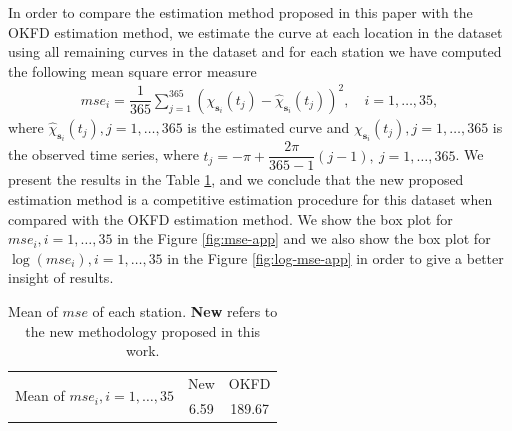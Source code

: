 \documentclass[
  12pt,
]{article}
\theoremstyle{definition}
\theoremstyle{definition}
\theoremstyle{definition}
\theoremstyle{remark}
\begin{document}
In order to compare the estimation method proposed in this paper with the OKFD estimation method, we estimate the curve at each location in the dataset using all remaining curves in the dataset and for each station we have computed the following mean square error measure
\begin{align*}
 mse_i = \dfrac{1}{365} \sum_{j=1}^{365} (\chi_{\bm{s}_i}(t_j) - \hat\chi_{\bm{s}_i}(t_j))^2, \quad i =1, \dots, 35,
\end{align*}
where \(\hat\chi_{\bm{s}_i}(t_j), j=1, \dots, 365\) is the estimated curve and \(\chi_{\bm{s}_i}(t_j), j=1, \dots, 365\) is the observed time series,
where \(t_j = -\pi + \dfrac{2\pi}{365-1}(j-1),\ j=1,\dots, 365\).
We present the results in the Table \ref{tab:error}, and we conclude that the new proposed estimation method is a competitive estimation procedure for this dataset when compared with the OKFD estimation method. We show the box plot for \(mse_i, i=1, \dots, 35\) in the Figure \ref{fig:mse-app} and we also show the box plot for \(\log(mse_i), i=1, \dots, 35\) in the Figure \ref{fig:log-mse-app} in order to give a better insight of results.

\begin{table}[htbp]
  \centering
  \caption{Mean of $mse$ of each station. \textbf{New} refers to the new methodology proposed in this work.}
    \begin{tabular}{lcc}
    \toprule
   \multirow{2}{*}{Mean of $mse_i, i=1,\dots, 35$} & New   & OKFD \\ \cmidrule{2-3}
    & 6.59  & 189.67 \\ \bottomrule
    \end{tabular}
  \label{tab:error}
\end{table}
\end{document}
